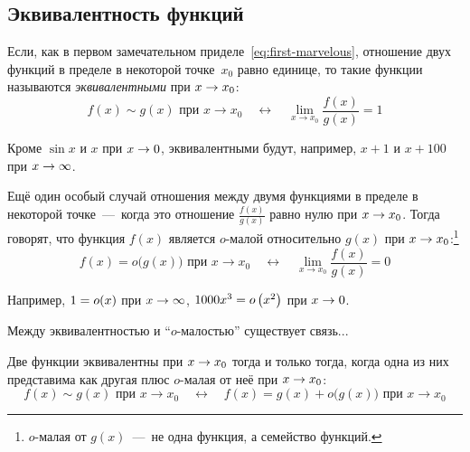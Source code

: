 \documentclass[a4paper,12pt]{article}
\begin{document}
  \subsection{Эквивалентность функций}

  Если, как в первом замечательном приделе~\eqref{eq:first-marvelous}, отношение двух функций в пределе в некоторой точке~$x_0$ равно единице, то такие функции называются \emph{эквивалентными} при $x \hm\to x_0$:
  \[
    f(x) \sim g(x) \mbox{ при } x \to x_0
      \quad\leftrightarrow\quad \lim_{x \to x_0} \frac{f(x)}{g(x)} = 1
  \]

  \begin{example}
   Кроме $\sin x$ и $x$ при $x \hm\to 0$, эквивалентными будут, например, $x + 1$ и $x + 100$ при $x \hm\to \infty$.
  \end{example}

  Ещё один особый случай отношения между двумя функциями в пределе в некоторой точке~---~когда это отношение $\frac{f(x)}{g(x)}$ равно нулю при $x \hm\to x_0$.
  Тогда говорят, что функция $f(x)$ является $o$-малой относительно $g(x)$ при $x \hm\to x_0$:\footnote{
    $o$-малая от $g(x)$~---~не одна функция, а семейство функций.
  }
  \[
    f(x) = o\bigl(g(x)\bigr) \mbox{ при } x \to x_0
      \quad\leftrightarrow\quad \lim_{x \to x_0} \frac{f(x)}{g(x)} = 0
  \]

  \begin{example}
    Например, $1 \hm= o(x)$ при $x \hm\to \infty$, $1000x^3 \hm= o\left(x^2\right)$ при $x \hm\to 0$.
  \end{example}

  Между эквивалентностью и ``$o$-малостью'' существует связь...

  \begin{proposition}
      Две функции эквивалентны при $x \hm\to x_0$ тогда и только тогда, когда одна из них представима как другая плюс $o$-малая от неё при $x \hm\to x_0$:
      \[
        f(x) \sim g(x) \mbox{ при } x \to x_0
          \quad\leftrightarrow\quad f(x) = g(x) + o\bigl(g(x)\bigr) \mbox{ при } x \to x_0
      \]
  \end{proposition}
\end{document}
